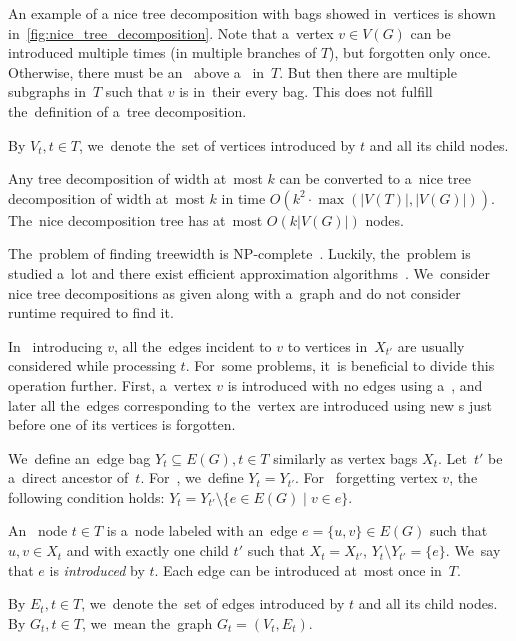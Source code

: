 An example of a nice tree decomposition with bags showed in~vertices
is shown in~\cref{fig:nice_tree_decomposition}.
%
Note that a~vertex \( v \in V(G) \) can be introduced multiple times
(in multiple branches of \( T \)),
but forgotten only once.
%
Otherwise, there must be an~\IntroduceVertexNode{} above a~\ForgetVertexNode{} in~\( T \).
But then there are multiple subgraphs in~\( T \)
such that \( v \) is in~their every bag.
This does not fulfill the~definition of a~tree decomposition.

By \( V_t, t \in T \), we~denote the~set of vertices introduced by \( t \)
and all its child nodes.
%
\begin{lemma}
	Any tree decomposition of width at~most \( k \) can be converted to
	a~nice tree decomposition of width at~most \( k \)
	in time \( O(k^2 \cdot \max(|V(T)|, |V(G)|)) \).
	The~nice decomposition tree has at~most \( O(k|V(G)|) \) nodes.
\end{lemma}

The~problem of finding treewidth is NP-complete~\cite{tree_width_np_complete}.
Luckily, the~problem is studied a~lot and
there exist efficient approximation algorithms~\cite{tree_width_approximation}.
We~consider nice tree decompositions as given along with a~graph
and do not consider runtime required to find it.

In~\IntroduceVertexNode{} introducing \( v \), all the~edges incident to \( v \)
to vertices in~\( X_{t'} \) are usually considered while processing \( t \).
%
For~some problems, it~is beneficial to divide this operation further.
First, a~vertex \( v \) is introduced with no edges using a~\IntroduceVertexNode{},
and later all the~edges corresponding to the~vertex are introduced using new \IntroduceEdgeNode{}s
just before one of its vertices is forgotten.

We~define an~edge bag \( Y_t \subseteq E(G), t \in T \) similarly as vertex bags \( X_t \).
%
Let~\( t' \) be a~direct ancestor of~\( t \).
For~\IntroduceVertexNode{}, we~define \( Y_t = Y_{t'} \).
For~\ForgetVertexNode{} forgetting vertex \( v \),
the following condition holds: \( Y_t = Y_{t'} \setminus \{ e \in E(G) \mid v \in e\} \).
%
\begin{definition}
	An~\IntroduceEdgeNode{} node \( t \in T \) is a~node
	labeled with an~edge \( e = \{u, v\} \in E(G) \)
	such that \( u, v \in X_t \) and with exactly one child \( t' \)
	such that \( X_t = X_{t'} \), \( Y_t \setminus Y_{t'} = \{e\} \).
	We~say that \( e \) is \emph{introduced} by \( t \).
	Each edge can be introduced at~most once in~\( T \).
\end{definition}
%
By \( E_t, t \in T \), we~denote the~set of edges introduced by \( t \)
and all its child nodes.
By \( G_t, t \in T \), we~mean the~graph \( G_t = (V_t, E_t) \).

